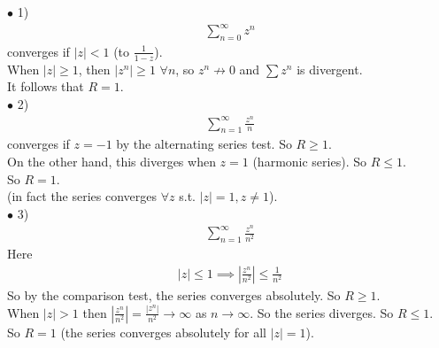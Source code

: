 \documentclass[a4paper]{article}
\begin{document}
\begin{eg}
$\bullet$ 1)
\begin{equation*}
\begin{aligned}
\sum_{n=0}^\infty z^n
\end{aligned}
\end{equation*}
converges if $|z|<1$ (to $\frac{1}{1-z}$).\\
When $|z| \geq 1$, then $|z^n|\geq 1$ $\forall n$, so $z^n \not\to 0$ and $\sum z^n$ is divergent.\\
It follows that $R=1$.\\
$\bullet$ 2)
\begin{equation*}
\begin{aligned}
\sum_{n=1}^\infty \frac{z^n}{n}
\end{aligned}
\end{equation*}
converges if $z=-1$ by the alternating series test. So $R\geq 1$.\\
On the other hand, this diverges when $z=1$ (harmonic series). So $R\leq 1$.\\
So $R=1$.\\
(in fact the series converges $\forall z$ s.t. $|z|=1, z\neq 1$).\\
$\bullet$ 3)
\begin{equation*}
\begin{aligned}
\sum_{n=1}^\infty \frac{z^n}{n^2}
\end{aligned}
\end{equation*}
Here
\begin{equation*}
\begin{aligned}
|z|\leq 1 \implies |\frac{z^n}{n^2}|\leq\frac{1}{n^2}
\end{aligned}
\end{equation*}
So by the comparison test, the series converges absolutely. So $R\geq 1$.\\
When $|z|>1$ then $|\frac{z^n}{n^2}|=\frac{|z^n|}{n^2} \to \infty$ as $n\to\infty$. So the series diverges. So $R\leq 1$.\\
So $R=1$ (the series converges absolutely for all $|z|=1$).
\end{eg}
\end{document}
